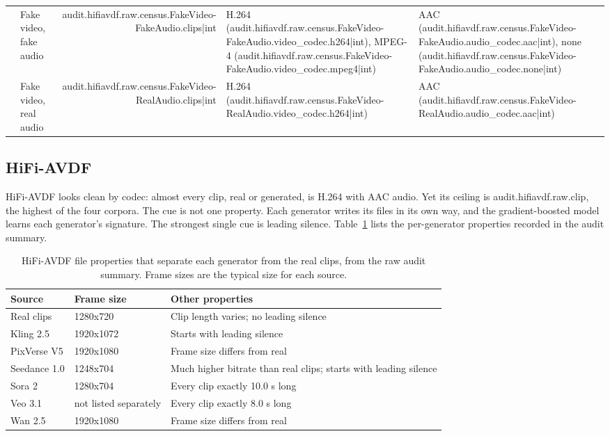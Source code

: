 \begin{table}[ht]
\begin{tabularx}{\textwidth}{@{}l l r >{\raggedright\arraybackslash}X >{\raggedright\arraybackslash}X@{}}
                  & Fake video, fake audio & {{audit.hifiavdf.raw.census.FakeVideo-FakeAudio.clips|int}} & H.264 ({{audit.hifiavdf.raw.census.FakeVideo-FakeAudio.video_codec.h264|int}}), MPEG-4 ({{audit.hifiavdf.raw.census.FakeVideo-FakeAudio.video_codec.mpeg4|int}}) & AAC ({{audit.hifiavdf.raw.census.FakeVideo-FakeAudio.audio_codec.aac|int}}), none ({{audit.hifiavdf.raw.census.FakeVideo-FakeAudio.audio_codec.none|int}}) \\
                  & Fake video, real audio & {{audit.hifiavdf.raw.census.FakeVideo-RealAudio.clips|int}} & H.264 ({{audit.hifiavdf.raw.census.FakeVideo-RealAudio.video_codec.h264|int}}) & AAC ({{audit.hifiavdf.raw.census.FakeVideo-RealAudio.audio_codec.aac|int}}) \\
        \bottomrule
    \end{tabularx}
\end{table}

\subsection{HiFi-AVDF}

HiFi-AVDF looks clean by codec: almost every clip, real or generated, is H.264
with AAC audio. Yet its ceiling is {{audit.hifiavdf.raw.clip}}, the highest of
the four corpora. The cue is not one property. Each generator writes its files
in its own way, and the gradient-boosted model learns each generator's
signature. The strongest single cue is leading silence. Table~\ref{tab:hifi}
lists the per-generator properties recorded in the audit summary.

\begin{table}[ht]
    \centering
    \small
    \caption{HiFi-AVDF file properties that separate each generator from the real clips, from the raw audit summary. Frame sizes are the typical size for each source.}
    \label{tab:hifi}
    \begin{tabularx}{\textwidth}{@{}l l >{\raggedright\arraybackslash}X@{}}
        \toprule
        \textbf{Source} & \textbf{Frame size} & \textbf{Other properties} \\
        \midrule
        Real clips   & 1280x720 & Clip length varies; no leading silence \\
        Kling 2.5    & 1920x1072 & Starts with leading silence \\
        PixVerse V5  & 1920x1080 & Frame size differs from real \\
        Seedance 1.0 & 1248x704 & Much higher bitrate than real clips; starts with leading silence \\
        Sora 2       & 1280x704 & Every clip exactly 10.0 s long \\
        Veo 3.1      & not listed separately & Every clip exactly 8.0 s long \\
        Wan 2.5      & 1920x1080 & Frame size differs from real \\
        \bottomrule
    \end{tabularx}
\end{table}

